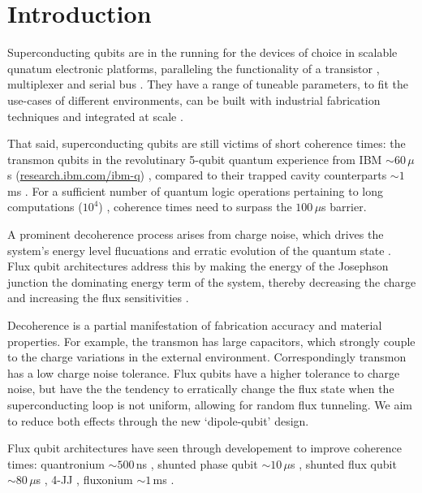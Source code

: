 \section{Introduction}
 \noindent Superconducting qubits are in the running for the devices of choice in scalable qunatum electronic platforms, paralleling the functionality of a transistor \cite{Astafiev2010}\cite{hoi2011}, multiplexer \cite{honigl2018} and serial bus \cite{shen2005}. They have a range of tuneable parameters, to fit the use-cases of different environments, can be built with industrial fabrication techniques and integrated at scale \cite{johnson2010}. 
 
 That said, superconducting qubits are still victims of short coherence times: the transmon qubits in the revolutinary 5-qubit quantum experience from IBM $ \sim 60\,\mu $s (\href{http://www.research.ibm.com/ibm-q}{research.ibm.com/ibm-q}) \cite{linke2017}, compared to their trapped cavity counterparts $\sim1\, $ms \cite{monroe1995}. For a sufficient number of quantum logic operations pertaining to long computations ($ 10^{4} $) \cite{orlando1999}, coherence times need to surpass the $ 100\,\mu$s barrier.
 
 A prominent decoherence process arises from charge noise, which drives the system's energy level flucuations and erratic evolution of the quantum state \cite{devoret2008}. Flux qubit architectures \cite{chiorescu2003}\cite{mooij1999} address this by making the energy of the Josephson junction the dominating energy term of the system, thereby decreasing the charge and increasing the flux sensitivities \cite{orlando1999}.

Decoherence is a partial manifestation of fabrication accuracy and material properties. For example, the transmon has large capacitors, which strongly couple to the charge variations in the external environment. Correspondingly transmon has a low charge noise tolerance. Flux qubits have a higher tolerance to charge noise, but have the the tendency to erratically change the flux state when the superconducting loop is not uniform, allowing for random flux tunneling. We aim to reduce both effects through the new `dipole-qubit' design.


 Flux qubit architectures have seen through developement to improve coherence times: quantronium $\sim500\,$ns \cite{cottet2002} \cite{gu2017}, shunted phase qubit $\sim10\,\mu $s \cite{stern2014} , shunted flux qubit $\sim80\,\mu$s \cite{yan2016} , 4-JJ \cite{qui2016}, fluxonium $\sim1\,$ms \cite{pop2014}. 
 
